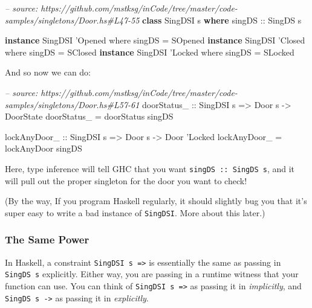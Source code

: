 \documentclass[]{article}
\newenvironment{Shaded}{}{}
\newcommand{\KeywordTok}[1]{\textcolor[rgb]{0.00,0.44,0.13}{\textbf{#1}}}
\newcommand{\DataTypeTok}[1]{\textcolor[rgb]{0.56,0.13,0.00}{#1}}
\newcommand{\CharTok}[1]{\textcolor[rgb]{0.25,0.44,0.63}{#1}}
\newcommand{\CommentTok}[1]{\textcolor[rgb]{0.38,0.63,0.69}{\textit{#1}}}
\newcommand{\OtherTok}[1]{\textcolor[rgb]{0.00,0.44,0.13}{#1}}
\newcommand{\FunctionTok}[1]{\textcolor[rgb]{0.02,0.16,0.49}{#1}}
\newcommand{\NormalTok}[1]{#1}
\begin{document}
\begin{Shaded}
\begin{Highlighting}[]
\CommentTok{-- source: https://github.com/mstksg/inCode/tree/master/code-samples/singletons/Door.hs#L47-55}
\KeywordTok{class} \DataTypeTok{SingDSI}\NormalTok{ s }\KeywordTok{where}
\OtherTok{    singDS ::} \DataTypeTok{SingDS}\NormalTok{ s}

\KeywordTok{instance} \DataTypeTok{SingDSI} \CharTok{'Opened where}
\NormalTok{    singDS }\FunctionTok{=} \DataTypeTok{SOpened}
\KeywordTok{instance} \DataTypeTok{SingDSI} \CharTok{'Closed where}
\NormalTok{    singDS }\FunctionTok{=} \DataTypeTok{SClosed}
\KeywordTok{instance} \DataTypeTok{SingDSI} \CharTok{'Locked where}
\NormalTok{    singDS }\FunctionTok{=} \DataTypeTok{SLocked}
\end{Highlighting}
\end{Shaded}

And so now we can do:

\begin{Shaded}
\begin{Highlighting}[]
\CommentTok{-- source: https://github.com/mstksg/inCode/tree/master/code-samples/singletons/Door.hs#L57-61}
\OtherTok{doorStatus_ ::} \DataTypeTok{SingDSI}\NormalTok{ s }\OtherTok{=>} \DataTypeTok{Door}\NormalTok{ s }\OtherTok{->} \DataTypeTok{DoorState}
\NormalTok{doorStatus_ }\FunctionTok{=}\NormalTok{ doorStatus singDS}

\OtherTok{lockAnyDoor_ ::} \DataTypeTok{SingDSI}\NormalTok{ s }\OtherTok{=>} \DataTypeTok{Door}\NormalTok{ s }\OtherTok{->} \DataTypeTok{Door} \CharTok{'Locked}
\NormalTok{lockAnyDoor_ }\FunctionTok{=}\NormalTok{ lockAnyDoor singDS}
\end{Highlighting}
\end{Shaded}

Here, type inference will tell GHC that you want \texttt{singDS\ ::\ SingDS\ s},
and it will pull out the proper singleton for the door you want to check!

(By the way, If you program Haskell regularly, it should slightly bug you that
it's super easy to write a bad instance of \texttt{SingDSI}. More about this
later.)

\subsubsection{The Same Power}\label{the-same-power}

In Haskell, a constraint \texttt{SingDSI\ s\ =\textgreater{}} is essentially the
same as passing in \texttt{SingDS\ s} explicitly. Either way, you are passing in
a runtime witness that your function can use. You can think of
\texttt{SingDSI\ s\ =\textgreater{}} as passing it in \emph{implicitly}, and
\texttt{SingDS\ s\ -\textgreater{}} as passing it in \emph{explicitly}.
\end{document}
